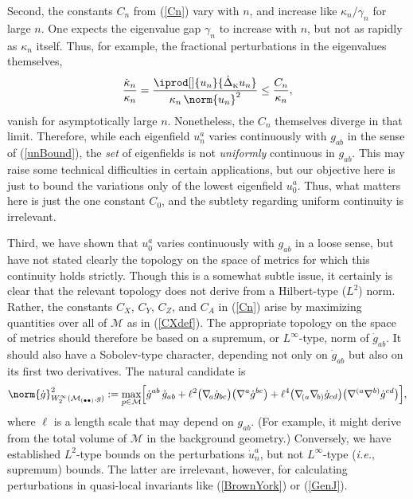\documentclass[12pt,letterpaper]{iopart}
\newcommand\dLap[1][K]{\dot\Delta_{\scriptscriptstyle\mathrm{#1}}}
\newcommand\M{\mathcal{M}}
\newcommand\ind{{\bullet}}
\begin{document}
Second, the constants $C_n$ from (\ref{Cn}) vary with $n$, and increase like $\kappa_n / \gamma_n$ for large $n$.  One expects the eigenvalue gap $\gamma_n$ to increase with $n$, but not as rapidly as $\kappa_n$ itself.  Thus, for example, the fractional perturbations in the eigenvalues themselves, 
%
\begin{equation}\label{dlnkn}
	\frac{\dot\kappa_n}{\kappa_n}
		= \frac{\iprod[\nml]{u_n}{\dLap u_n}}{\kappa_n\, \norm{u_n}^2} 
		\le \frac{C_n}{\kappa_n},
\end{equation}
%
vanish for asymptotically large $n$.  Nonetheless, the $C_n$ themselves diverge in that limit.  Therefore, while each eigenfield $u_n^a$ varies continuously with $g_{ab}$ in the sense of (\ref{unBound}), the \textit{set} of eigenfields is not \textit{uniformly} continuous in $g_{ab}$.  This may raise some technical difficulties in certain applications, but our objective here is just to bound the variations only of the lowest eigenfield $u_0^a$.  Thus, what matters here is just the one constant $C_0$, and the subtlety regarding uniform continuity is irrelevant.

Third, we have shown that $u_0^a$ varies continuously with $g_{ab}$ in a loose sense, but have not stated clearly the topology on the space of metrics for which this continuity holds strictly.  Though this is a somewhat subtle issue, it certainly is clear that the relevant topology does not derive from a Hilbert-type ($L^2$) norm.  Rather, the constants $C_X$, $C_Y$, $C_Z$, and $C_A$ in (\ref{Cn}) arise by maximizing quantities over all of $\M$ as in (\ref{CXdef}).  The appropriate topology on the space of metrics should therefore be based on a supremum, or $L^\infty$-type, norm of $\dot g_{ab}$.  It should also have a Sobolev-type character, depending not only on $\dot g_{ab}$ but also on its first two derivatives.  The natural candidate is
%
\begin{equation}\label{sNorm}
	\norm{\dot g}^2_{W_2^\infty(\M_{(\ind\ind)}, g)} 
		:= \max_{p \in \M} \Bigl[ \dot g^{ab}\, \dot g_{ab} 
			+ \ell^2 \bigl( \grad\!_a \dot g_{bc} \bigr) \bigl( \grad^a \dot g^{bc} \bigr)
			+ \ell^4 \bigl( \grad\!_{(a} \grad\!_{b)} \dot g_{cd} \bigr) \bigl( \grad^{(a} \grad^{b)} \dot g^{cd} \bigr) 
			\Bigr], 
\end{equation}
%
where $\ell$ is a length scale that may depend on $g_{ab}$.  (For example, it might derive from the total volume of $\M$ in the background geometry.)  Conversely, we have established $L^2$-type bounds on the perturbations $\dot u_n^a$, but not $L^\infty$-type (\textit{i.e.}, supremum) bounds.  The latter are irrelevant, however, for calculating perturbations in quasi-local invariants like (\ref{BrownYork}) or (\ref{GenJ}).
\end{document}
